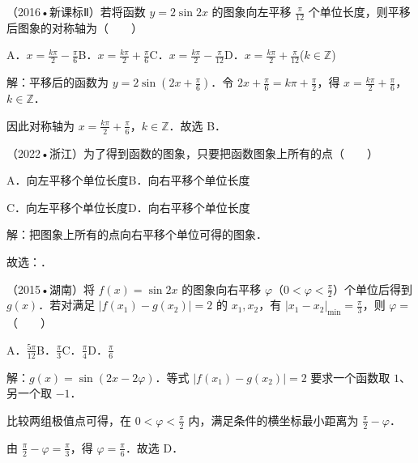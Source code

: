 \begin{question}
（2016•新课标Ⅱ）若将函数 $y=2\sin 2x$ 的图象向左平移 $\frac{\pi}{12}$ 个单位长度，则平移后图象的对称轴为（　　）\par A．$x=\frac{k\pi}{2}-\frac{\pi}{6}$\quad B．$x=\frac{k\pi}{2}+\frac{\pi}{6}$\quad C．$x=\frac{k\pi}{2}-\frac{\pi}{12}$\quad D．$x=\frac{k\pi}{2}+\frac{\pi}{12}$\quad($k\in\mathbb Z$)\par
\begin{solution}
解：平移后的函数为 $y=2\sin(2x+\frac{\pi}{6})$．令 $2x+\frac{\pi}{6}=k\pi+\frac{\pi}{2}$，得 $x=\frac{k\pi}{2}+\frac{\pi}{6}$，$k\in\mathbb Z$．\par
因此对称轴为 $x=\frac{k\pi}{2}+\frac{\pi}{6}$，$k\in\mathbb Z$．故选 B．\par
\end{solution}
\end{question}

\begin{question}
（2022•浙江）为了得到函数的图象，只要把函数图象上所有的点（　　）\par
\qquad{}A．向左平移个单位长度\qquad{}B．向右平移个单位长度\qquad{}\par
\qquad{}C．向左平移个单位长度\qquad{}D．向右平移个单位长度\par
\begin{solution}
解：把图象上所有的点向右平移个单位可得的图象．\par
故选：．\par
\end{solution}
\end{question}

\begin{question}
（2015•湖南）将 $f(x)=\sin2x$ 的图象向右平移 $\varphi$（$0<\varphi<\frac{\pi}{2}$）个单位后得到 $g(x)$．若对满足 $|f(x_1)-g(x_2)|=2$ 的 $x_1,x_2$，有 $|x_1-x_2|_{\min}=\frac{\pi}{3}$，则 $\varphi=$（　　）\par A．$\frac{5\pi}{12}$\qquad B．$\frac{\pi}{3}$\qquad C．$\frac{\pi}{4}$\qquad D．$\frac{\pi}{6}$\par
\begin{solution}
解：$g(x)=\sin(2x-2\varphi)$．等式 $|f(x_1)-g(x_2)|=2$ 要求一个函数取 $1$、另一个取 $-1$．\par
比较两组极值点可得，在 $0<\varphi<\frac{\pi}{2}$ 内，满足条件的横坐标最小距离为 $\frac{\pi}{2}-\varphi$．\par
由 $\frac{\pi}{2}-\varphi=\frac{\pi}{3}$，得 $\varphi=\frac{\pi}{6}$．故选 D．\par
\end{solution}
\end{question}

